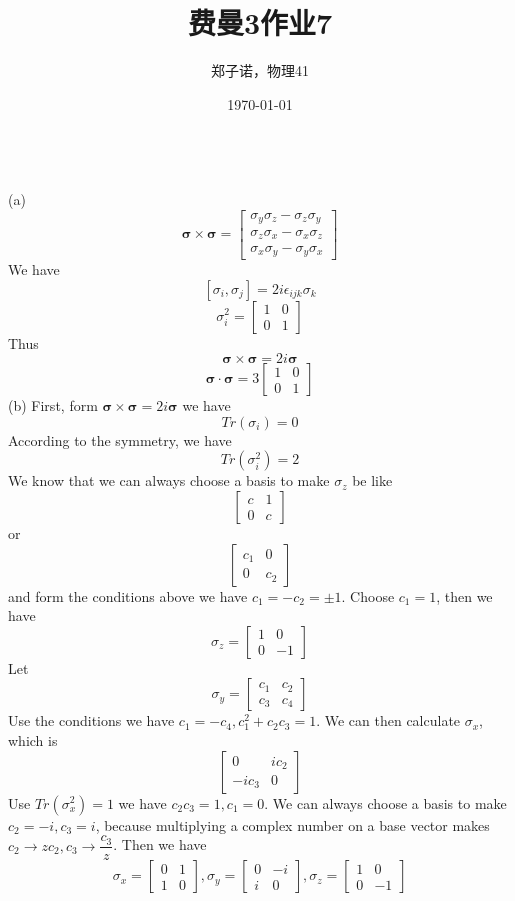 \documentclass[utf8]{ctexart}
\title{费曼3作业7}
\author{郑子诺，物理41}
\date{\today}
\begin{document}
\maketitle
{}\\
(a)
\[\bm{\sigma}\times\bm{\sigma}=\begin{bmatrix}
	\sigma_y\sigma_z-\sigma_z\sigma_y\\
	\sigma_z\sigma_x-\sigma_x\sigma_z\\
	\sigma_x\sigma_y-\sigma_y\sigma_x
\end{bmatrix}\]
We have
\[[\sigma_i,\sigma_j]=2i\epsilon_{ijk}\sigma_k\]
\[\sigma^2_i=\begin{bmatrix}
	1&0\\
	0&1
\end{bmatrix}\]
Thus
\[\bm{\sigma}\times\bm{\sigma}=2i\bm{\sigma}\]
\[\bm{\sigma}\cdot\bm{\sigma}=
3\begin{bmatrix}
	1&0\\
	0&1
\end{bmatrix}\]
(b)
First, form $\bm{\sigma}\times\bm{\sigma}=2i\bm{\sigma}$ we have
\[Tr(\sigma_i)=0\]
According to the symmetry, we have
\[Tr(\sigma^2_i)=2\]
We know that we can always choose a basis to make $\sigma_z$ be like
\[\begin{bmatrix}
	c&1\\
	0&c
\end{bmatrix}\]
or
\[\begin{bmatrix}
	c_1&0\\
	0&c_2
\end{bmatrix}\]
and form the conditions above we have $c_1=-c_2=\pm1$. Choose $c_1=1$, then we have
\[\sigma_z=\begin{bmatrix}
	1&0\\
	0&-1
\end{bmatrix}\]
Let
\[\sigma_y=\begin{bmatrix}
	c_1&c_2\\
	c_3&c_4
\end{bmatrix}\]
Use the conditions we have $c_1=-c_4,c_1^2+c_2c_3=1$. We can then calculate $\sigma_x$, which is
\[\begin{bmatrix}
	0&ic_2\\
	-ic_3&0
\end{bmatrix}\]
Use $Tr(\sigma_x^2)=1$ we have $c_2c_3=1,c_1=0$. We can always choose a basis to make $c_2=-i,c_3=i$, because multiplying a complex number on a base vector makes $c_2\rightarrow zc_2,c_3\rightarrow \dfrac{c_3}{z}$. Then we have
\[\sigma_x=\begin{bmatrix}
	0&1\\
	1&0
\end{bmatrix},\sigma_y=\begin{bmatrix}
0&-i\\
i&0
\end{bmatrix},\sigma_z=\begin{bmatrix}
1&0\\
0&-1
\end{bmatrix}\]
\end{document}
